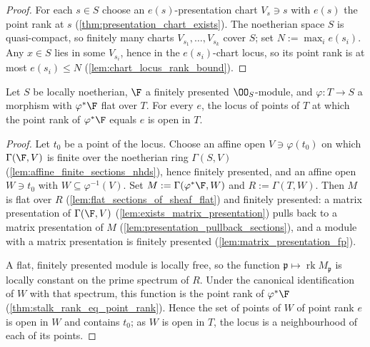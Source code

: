 \begin{proof}
  \leanok
  For each \(s \in S\) choose an \(e(s)\)-presentation chart \(V_s \ni s\)
  with \(e(s)\) the point rank at \(s\)
  (\cref{thm:presentation_chart_exists}).  The noetherian space \(S\) is
  quasi-compact, so finitely many charts \(V_{s_1}, \dots, V_{s_k}\) cover
  \(S\); set \(N := \max_i e(s_i)\).  Any \(x \in S\) lies in some
  \(V_{s_i}\), hence in the \(e(s_i)\)-chart locus, so its point rank is at
  most \(e(s_i) \le N\) (\cref{lem:chart_locus_rank_bound}).
\end{proof}

\begin{theorem}
  \label{thm:rank_fibers_open}
  \leanok
  Let \(S\) be locally noetherian, \(\F\) a finitely presented
  \(\OO_S\)-module, and \(\varphi : T \to S\) a morphism with
  \(\varphi^*\F\) flat over \(T\).  For every \(e\), the locus of points of
  \(T\) at which the point rank of \(\varphi^*\F\) equals \(e\) is open in
  \(T\).
\end{theorem}

\begin{proof}
  \leanok
  Let \(t_0\) be a point of the locus.  Choose an affine open
  \(V \ni \varphi(t_0)\) on which \(\Gamma(\F, V)\) is finite over the
  noetherian ring \(\Gamma(S, V)\)
  (\cref{lem:affine_finite_sections_nhds}), hence finitely presented, and
  an affine open \(W \ni t_0\) with \(W \subseteq \varphi^{-1}(V)\).  Set
  \(M := \Gamma(\varphi^*\F, W)\) and \(R := \Gamma(T, W)\).  Then \(M\) is
  flat over \(R\) (\cref{lem:flat_sections_of_sheaf_flat}) and finitely
  presented: a matrix presentation of \(\Gamma(\F, V)\)
  (\cref{lem:exists_matrix_presentation}) pulls back to a matrix
  presentation of \(M\) (\cref{lem:presentation_pullback_sections}), and a
  module with a matrix presentation is finitely presented
  (\cref{lem:matrix_presentation_fp}).

  A flat, finitely presented module is locally free, so the function
  \(\mathfrak p \mapsto \operatorname{rk} M_{\mathfrak p}\) is locally
  constant on the prime spectrum of \(R\).  Under the canonical
  identification of \(W\) with that spectrum, this function is the point
  rank of \(\varphi^*\F\) (\cref{thm:stalk_rank_eq_point_rank}).  Hence the
  set of points of \(W\) of point rank \(e\) is open in \(W\) and contains
  \(t_0\); as \(W\) is open in \(T\), the locus is a neighbourhood of each
  of its points.
\end{proof}

